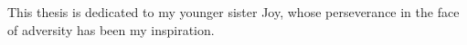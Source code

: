 \begin{frontmatter}
\begin{acknowledgment}
\end{acknowledgment}

\begin{dedication}
 
This thesis is dedicated to my younger sister Joy, whose perseverance in the face of adversity has been my inspiration.

\end{dedication}

\tableofcontents

\listoftables

\listoffigures

\end{frontmatter}

